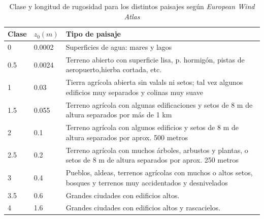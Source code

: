 \documentclass{IEEEtran}
\begin{document}
\begin{table}[H]
    \centering
    \label{Tabla: Clase y longitud de rugosidad.}
    \caption{Clase y longitud de rugosidad para los distintos paisajes según \textit{European Wind Atlas}}
    \begin{tabular}{|l|l|p{13cm}|}
        \hline
        Clase & $z_0(m)$ & Tipo de paisaje \\
        \hline
        0 & 0.0002 & Superficies de agua: mares y lagos \\
        0.5 & 0.0024 & Terreno abierto con superficie lisa, p. hormigón, pistas de aeropuerto,hierba cortada, etc. \\
        1 & 0.03 & Tierra agrícola abierta sin valals ni setos; tal vez algunos edificios muy separados y colinas muy suave \\
        1.5 & 0.055 & Terreno agrícola con algunas edificaciones y setos de 8 m de altura separados por más de 1 km \\
        2 & 0.1 & Terreno agrícola con algunos edificios y setos de 8 m de altura separados por aprox. 500 metros \\
        2.5 & 0.2 & Terreno agrícola con muchos árboles, arbustos y plantas, o setos de 8 m de altura separados por aprox. 250 metros \\
        3 & 0.4 & Pueblos, aldeas, terrenos agrícolas con muchos o altos setos, bosques y terrenos muy accidentados y desnivelados \\
        3.5 & 0.6 & Grandes ciudades con edificios altos. \\
        4 & 1.6 & Grandes ciudades con edificios altos y rascacielos. \\ 
        \hline
    \end{tabular}
\end{table}
\end{document}
